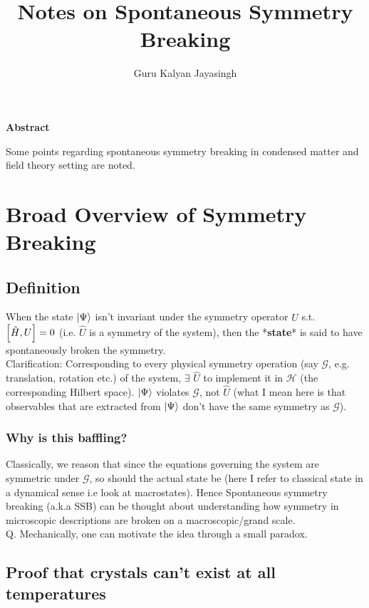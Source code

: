 \documentclass[12pt]{article}
\title{\Huge{Notes on Spontaneous Symmetry Breaking}}
\author{\Large{Guru Kalyan Jayasingh}}
\begin{document}
\maketitle

\hline
\begin{center}
    \bf{Abstract}
\end{center}
Some points regarding spontaneous symmetry breaking in condensed matter and field theory setting are noted.

\tableofcontents


\large
\section{Broad Overview of Symmetry Breaking}

\subsection{Definition}

When the state $\ket{\Psi}$ isn't invariant under the symmetry operator $\hat{U}$
s.t. $\comm{\hat{H}}{U}=0$ (i.e. $\hat{U}$ is a symmetry of the system), then the *\textbf{state}* is said to have spontaneously broken the symmetry.\\

Clarification: Corresponding to every physical symmetry operation (say $\mathcal{G}$, e.g. translation, rotation etc.) of the system, $\exists$ $\hat{U}$ to implement it in $\mathscr{H}$ (the corresponding Hilbert space).
$\ket{\Psi}$ violates $\mathcal{G}$, not $\hat{U}$ (what I mean here is that observables that are extracted from $\ket{\Psi}$ don't have the same symmetry as $\mathcal{G}$).
\subsubsection{Why is this baffling?}

Classically, we reason that since the equations governing the system are symmetric under $\mathcal{G}$, so should the actual state be (here I refer to classical state in a dynamical sense i.e look at macrostates). Hence Spontaneous symmetry breaking (a.k.a SSB) can be thought about understanding how symmetry in microscopic descriptions are broken on a macroscopic/grand scale.\\
Q. Mechanically, one can motivate the idea through a small paradox.

\subsection{Proof that crystals can't exist at all temperatures}
\end{document}

